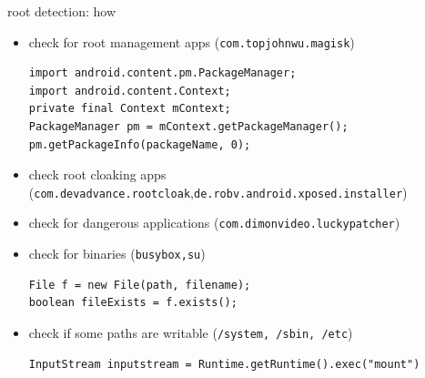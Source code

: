 \documentclass{beamer}
\begin{document}



\begin{frame}[fragile]{root detection: how}

    \begin{itemize}[<+->]
        \item check for root management apps (\texttt{com.topjohnwu.magisk})
              \begin{verbatim}
import android.content.pm.PackageManager;
import android.content.Context;
private final Context mContext;
PackageManager pm = mContext.getPackageManager();
pm.getPackageInfo(packageName, 0);
\end{verbatim}
        \item check root cloaking apps {\small (\texttt{com.devadvance.rootcloak},\texttt{de.robv.android.xposed.installer})}
        \item check for dangerous applications (\texttt{com.dimonvideo.luckypatcher})
        \item check for binaries (\texttt{busybox,su})
              \begin{verbatim}
File f = new File(path, filename);
boolean fileExists = f.exists();
\end{verbatim}
        \item check if some paths are writable (\texttt{/system, /sbin, /etc})
              \begin{verbatim}
InputStream inputstream = Runtime.getRuntime().exec("mount")
\end{verbatim}
    \end{itemize}

\end{frame}
\end{document}
